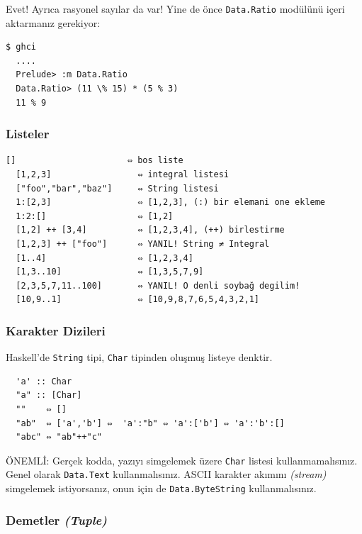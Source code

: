 \documentclass[a4paper,14pt,openany]{extbook} %
\let\emph\textit
\begin{document}
Evet! Ayrıca rasyonel sayılar da var! Yine de önce \lstinline!Data.Ratio!
modülünü içeri aktarmanız gerekiyor:

\begin{lstlisting}[language=shell,numbers=none,nolol]
  $ ghci
  ....
  Prelude> :m Data.Ratio
  Data.Ratio> (11 \% 15) * (5 % 3)
  11 % 9
\end{lstlisting}

\subsubsection{Listeler}\label{listeler}

\begin{lstlisting}[language=shell,numbers=none,nolol]
  []                      ⇔ bos liste
  [1,2,3]                 ⇔ integral listesi
  ["foo","bar","baz"]     ⇔ String listesi
  1:[2,3]                 ⇔ [1,2,3], (:) bir elemani one ekleme
  1:2:[]                  ⇔ [1,2]
  [1,2] ++ [3,4]          ⇔ [1,2,3,4], (++) birlestirme
  [1,2,3] ++ ["foo"]      ⇔ YANIL! String ≠ Integral
  [1..4]                  ⇔ [1,2,3,4]
  [1,3..10]               ⇔ [1,3,5,7,9]
  [2,3,5,7,11..100]       ⇔ YANIL! O denli soybağ degilim!
  [10,9..1]               ⇔ [10,9,8,7,6,5,4,3,2,1]
\end{lstlisting}

\subsubsection{Karakter Dizileri}\label{karakter-dizileri}

Haskell'de \lstinline!String! tipi, \lstinline!Char! tipinden oluşmuş
listeye denktir.

\begin{lstlisting}
  'a' :: Char
  "a" :: [Char]
  ""    ⇔ []
  "ab"  ⇔ ['a','b'] ⇔  'a':"b" ⇔ 'a':['b'] ⇔ 'a':'b':[]
  "abc" ⇔ "ab"++"c"
\end{lstlisting}

ÖNEMLİ: Gerçek kodda, yazıyı simgelemek üzere \lstinline!Char! listesi
kullanmamalısınız. Genel olarak \lstinline!Data.Text! kullanmalısınız.
ASCII karakter akımını \emph{(stream)} simgelemek istiyorsanız,
onun için de \lstinline!Data.ByteString! kullanmalısınız.

\subsubsection{Demetler \emph{(Tuple)}}\label{demetler-tuple}
\end{document}
